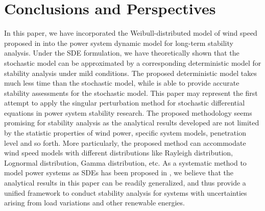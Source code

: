 \documentclass[journal]{IEEEtran}
\begin{document}
\section{Conclusions and Perspectives}\label{sectionconclusion}
In this paper, we have incorporated the Weibull-distributed model of wind speed proposed in \cite{Milano:2013_1} into the power system dynamic model for long-term stability analysis. Under the SDE formulation, we have theoretically shown that the stochastic model can be approximated by a corresponding deterministic model for stability analysis under mild conditions. The proposed deterministic model takes much less time than the stochastic model, while is able to provide accurate stability assessments for the stochastic model. 
This paper may represent the first attempt to apply the singular perturbation method for stochastic differential equations in power system stability research. The proposed methodology seems promising for stability analysis as the analytical results developed are not limited by the statistic properties of wind power, specific system models, penetration level and so forth. More particularly, the proposed method can accommodate wind speed models with different distributions like Rayleigh distribution, Lognormal distribution, Gamma distribution, etc. As a systematic method to model power systems as SDEs has been proposed in \cite{Milano:2013}, we believe that the analytical results in this paper can be readily generalized, and thus provide a unified framework to conduct stability analysis for systems with uncertainties arising from load variations and other renewable energies.
\end{document}
